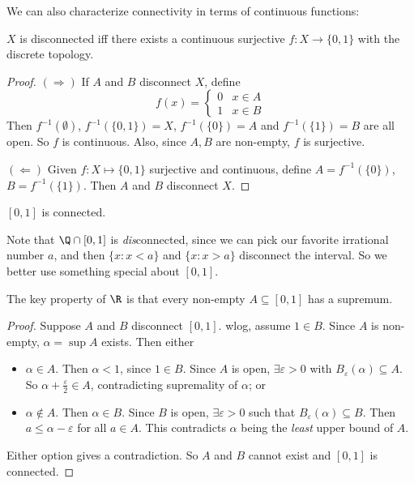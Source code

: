 \documentclass[a4paper]{article}
\begin{document}
We can also characterize connectivity in terms of continuous functions:
\begin{prop}
  $X$ is disconnected iff there exists a continuous surjective $f: X\to \{0, 1\}$ with the discrete topology.
\end{prop}

\begin{proof}
  $(\Rightarrow)$ If $A$ and $B$ disconnect $X$, define
  \[
    f(x) =
    \begin{cases}
      0 & x\in A\\
      1 & x\in B
    \end{cases}
  \]
  Then $f^{-1}(\emptyset)$, $f^{-1}(\{0, 1\}) = X$, $f^{-1}(\{0\}) = A$ and $f^{-1}(\{1\}) = B$ are all open. So $f$ is continuous. Also, since $A, B$ are non-empty, $f$ is surjective.

  $(\Leftarrow)$ Given $f: X\mapsto \{0, 1\}$ surjective and continuous, define $A = f^{-1}(\{0\})$, $B = f^{-1}(\{1\})$. Then $A$ and $B$ disconnect $X$.
\end{proof}

\begin{thm}
  $[0, 1]$ is connected.
\end{thm}

Note that $\Q\cap [0, 1]$ is \emph{dis}connected, since we can pick our favorite irrational number $a$, and then $\{x: x < a\}$ and $\{x: x > a\}$ disconnect the interval. So we better use something special about $[0, 1]$.

The key property of $\R$ is that every non-empty $A\subseteq [0, 1]$ has a supremum.
\begin{proof}
  Suppose $A$ and $B$ disconnect $[0, 1]$. wlog, assume $1\in B$. Since $A$ is non-empty, $\alpha = \sup A$ exists. Then either
  \begin{itemize}
    \item $\alpha \in A$. Then $\alpha < 1$, since $1 \in B$. Since $A$ is open, $\exists \varepsilon > 0$ with $B_\varepsilon(\alpha) \subseteq A$. So $\alpha + \frac{\varepsilon}{2} \in A$, contradicting supremality of $\alpha$; or

    \item $\alpha \not\in A$. Then $\alpha \in B$. Since $B$ is open, $\exists \varepsilon > 0$ such that $B_\varepsilon (\alpha) \subseteq B$. Then $a \leq \alpha - \varepsilon$ for all $a\in A$. This contradicts $\alpha$ being the \emph{least} upper bound of $A$.
  \end{itemize}

  Either option gives a contradiction. So $A$ and $B$ cannot exist and $[0, 1]$ is connected.
\end{proof}
\end{document}
